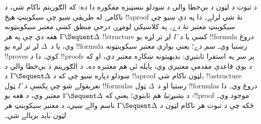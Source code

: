 \documentclass[../../../include/open-logic-section]{subfiles}
\begin{document}
د ثبوت د لټون د بې‌خطا والي د ښودلو بنسټيزه مفکوره
دا ده: که الګوريتم ناکام شي، د ناکامۍ له طريقې ښيو چې
سيکوېنټ هېڅ !!a{proof} نۀ شي لرلے۔ دا په دې ښيو چې
سيکوېنټ معتبر نۀ دے۔ په کلاسيکي لومړۍ درجې منطق کښې
معتبر سيکوېنټونه $\Gamma \Sequent \Delta$ هغه دي چې
په هر !!{structure} کښې يا د $\Gamma$ لږ تر لږه يو
!!{formula} دروغ وي، يا د~$\Delta$ لږ تر لږه يو
!!{formula} رښتيا وي۔  \emph{سم} دے؛ يعنې
يوازې معتبر سيکوېنټونه !!{prove}s کوي۔ دا د !!{proof}s پر
سر په استقرا ثابتېږي: بديهيتونه ښکاره معتبر دي، او که
د يوې قاعدې مقدمې معتبرې وي، پايله ئې هم معتبره ده۔
د الګوريتم د بې‌خطا والي د ښودلو دپاره ښيو چې که د
$\Gamma \Sequent \Delta$ د !!a{proof} لټون ناکام شي،
!!a{structure} تعريفولے شو چې پکښې د $\Gamma$ ټول
!!{formula}s رښتيا او د~$\Delta$ ټول !!{formula}s دروغ
وي۔ دا د  \emph{بشپړتيا} هم ثابتوي؛ يعنې که
$\Gamma \Sequent \Delta$ معتبر وي، د هغه يو
-!!{proof} موجود وي۔ ځکه چې د ثبوت هر ناکام
لټون د $\Gamma \Sequent \Delta$ ناسم والے ښيي، د معتبر
سيکوېنټ هر لټون بايد بريالے شي۔
\end{document}
